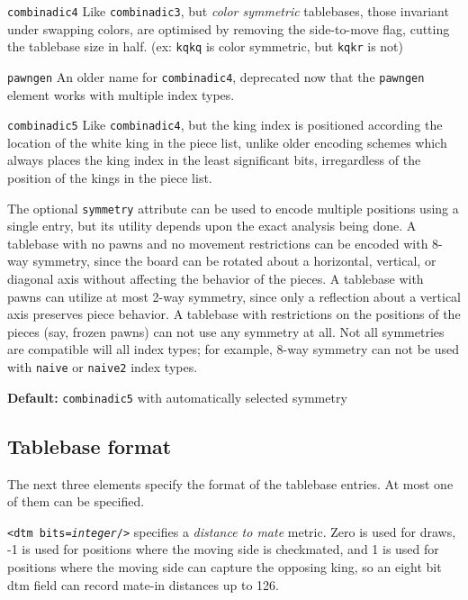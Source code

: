 \documentclass[11pt]{article}
\begin{document}
\begin{description}
\item {\tt combinadic4} Like {\tt combinadic3}, but {\it color
  symmetric} tablebases, those invariant under swapping colors,
  are optimised by removing the side-to-move flag, cutting the
  tablebase size in half.  (ex: {\tt kqkq} is color symmetric,
  but {\tt kqkr} is not)

\item {\tt pawngen} An older name for {\tt combinadic4}, deprecated
  now that the {\tt pawngen} element works with multiple index types.

\item {\tt combinadic5} Like {\tt combinadic4}, but the king index
  is positioned according the location of the white king in the
  piece list, unlike older encoding schemes which always places the
  king index in the least significant bits, irregardless of the
  position of the kings in the piece list.

\end{description}

The optional {\tt symmetry} attribute can be used to encode multiple
positions using a single entry, but its utility depends upon the exact
analysis being done.  A tablebase with no pawns and no movement
restrictions can be encoded with 8-way symmetry,
since the board can be rotated about a horizontal, vertical, or
diagonal axis without affecting the behavior of the pieces.  A
tablebase with pawns can utilize at most 2-way
symmetry, since only a reflection about a vertical axis preserves
piece behavior.  A tablebase with restrictions on the positions of the
pieces (say, frozen pawns) can not use any symmetry at all.
Not all symmetries are compatible will all index types; for example,
8-way symmetry can not be used with {\tt naive} or {\tt naive2}
index types.

{\bf Default:} {\tt combinadic5} with automatically selected symmetry

\subsection{Tablebase format}

The next three elements specify the format of the tablebase entries.
At most one of them can be specified.

{\tt <dtm bits={\it integer}/>} specifies a {\it distance to mate}
metric.  Zero is used for draws, -1 is used for positions where the
moving side is checkmated, and 1 is used for positions where the
moving side can capture the opposing king, so an eight bit dtm field
can record mate-in distances up to 126.
\end{document}
